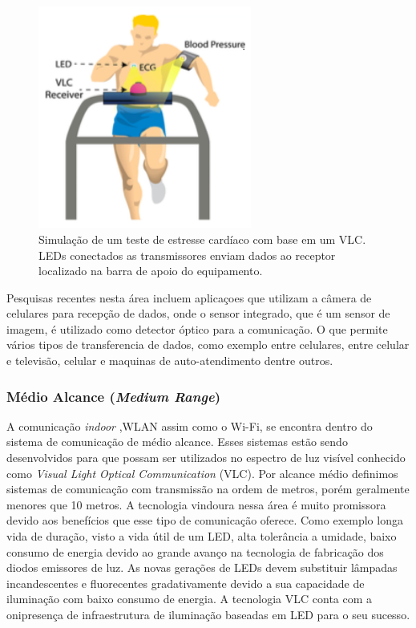 \begin{figure}
	\centering
		\includegraphics[width = 7cm]{figuras/short}
	\caption{Simulação de um teste de estresse cardíaco com base em um VLC. LEDs conectados as transmissores enviam dados ao receptor localizado na barra de apoio do equipamento.}
	\label{Fig: short}
\end{figure}

Pesquisas recentes nesta área incluem aplicaçoes que utilizam a câmera de celulares para recepção de dados, onde o sensor integrado, que é um sensor de imagem, é utilizado como detector óptico para a comunicação. O que permite vários tipos de transferencia de dados, como exemplo entre celulares, entre celular e televisão, celular e maquinas de auto-atendimento dentre outros.\cite{c.danakism.afganig.poveyiunderwoodh.haas2012}


\subsubsection{Médio Alcance (\textit{Medium Range})}

A comunicação \textit{indoor} ,WLAN assim como o Wi-Fi, se encontra dentro do sistema de comunicação de médio alcance. Esses sistemas estão sendo desenvolvidos para que possam ser utilizados no espectro de luz visível conhecido como \textit{Visual Light Optical Communication} (VLC). Por alcance médio definimos sistemas de comunicação com transmissão na ordem de metros, porém geralmente menores que 10 metros. A tecnologia vindoura nessa área é muito promissora devido aos benefícios que esse tipo de comunicação oferece. Como exemplo longa vida de duração, visto a vida útil de um LED, alta tolerância a umidade, baixo consumo de energia devido ao grande avanço na tecnologia de fabricação dos diodos emissores de luz.
As novas gerações de LEDs devem substituir lâmpadas incandescentes e fluorecentes gradativamente devido a sua capacidade de iluminação com baixo consumo de energia. A tecnologia VLC conta com a onipresença de infraestrutura de iluminação baseadas em LED para o seu sucesso.

